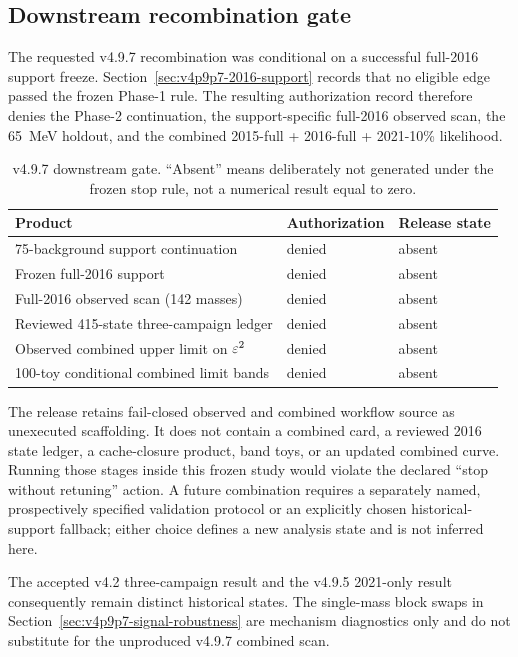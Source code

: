 \subsection{Downstream recombination gate}
\label{sec:v4p9p7-combined-gate}

The requested v4.9.7 recombination was conditional on a successful full-2016 support
freeze.  Section~\ref{sec:v4p9p7-2016-support} records that no eligible edge passed
the frozen Phase-1 rule.  The resulting authorization record therefore denies the
Phase-2 continuation, the support-specific full-2016 observed scan, the 65~MeV
holdout, and the combined 2015-full + 2016-full + 2021-10\% likelihood.

\begin{table}[htbp]
\centering
\small
\caption{v4.9.7 downstream gate.  ``Absent'' means deliberately not generated under
the frozen stop rule, not a numerical result equal to zero.}
\label{tab:v4p9p7-downstream-gate}
\begin{tabular}{lll}
\toprule
Product & Authorization & Release state \\
\midrule
75-background support continuation & denied & absent \\
Frozen full-2016 support & denied & absent \\
Full-2016 observed scan (142 masses) & denied & absent \\
Reviewed 415-state three-campaign ledger & denied & absent \\
Observed combined upper limit on $\varepsilon^2$ & denied & absent \\
100-toy conditional combined limit bands & denied & absent \\
\bottomrule
\end{tabular}
\end{table}

The release retains fail-closed observed and combined workflow source as unexecuted
scaffolding.  It does not contain a combined card, a reviewed 2016 state ledger, a
cache-closure product, band toys, or an updated combined curve.  Running those stages
inside this frozen study would violate the declared ``stop without retuning'' action.
A future combination requires a separately named, prospectively specified validation
protocol or an explicitly chosen historical-support fallback; either choice defines a
new analysis state and is not inferred here.

The accepted v4.2 three-campaign result and the v4.9.5 2021-only result consequently
remain distinct historical states.  The single-mass block swaps in
Section~\ref{sec:v4p9p7-signal-robustness} are mechanism diagnostics only and do not
substitute for the unproduced v4.9.7 combined scan.

\FloatBarrier

